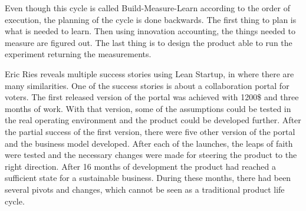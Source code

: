 Even though this cycle is called Build-Measure-Learn according to the order of execution, the planning of the cycle is done backwards. The first thing to plan is what is needed to learn. Then using innovation accounting, the things needed to measure are figured out. The last thing is to design the product able to run the experiment returning the measurements.

 Eric Ries reveals multiple success stories using Lean Startup, in where there are many similarities. One of the success stories is about a collaboration portal for voters. The first released version of the portal was achieved with 1200\$ and three months of work. With that version, some of the assumptions could be tested in the real operating environment and the product could be developed further. After the partial success of the first version, there were five other version of the portal and the business model developed. After each of the launches, the leaps of faith were tested and the necessary changes were made for steering the product to the right direction. After 16 months of development the product had reached a sufficient state for a sustainable business. During these months, there had been several pivots and changes, which cannot be seen as a traditional product life cycle.





 
 
 


 
 
 